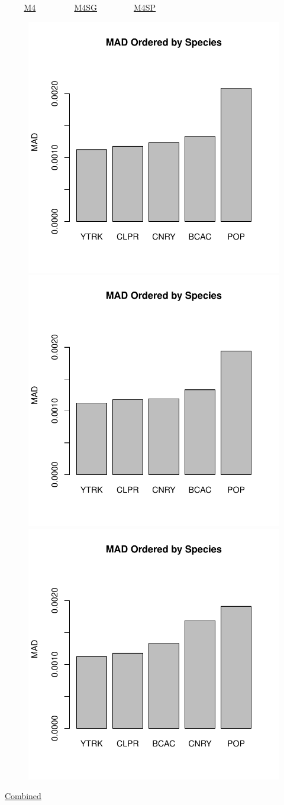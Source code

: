 \documentclass[ xcolor = pdftex, dvipsnames, table ]{beamer}
\begin{document}
\begin{frame}{$~~~~~~~~~$ \href{https://github.com/gasduster99/sppComp/tree/master/sscRuns/26919781982M4}{M4} $~~~~~~~~~~~~~~~~~~$ \href{https://github.com/gasduster99/sppComp/tree/master/sscRuns/26919781982M4IGSG}{M4SG} $~~~~~~~~~~~~~~~~~$ \href{https://github.com/gasduster99/sppComp/tree/master/sscRuns/26919781982M4IGSP}{M4SP} }
        \begin{figure}[ht!]
        \centering
        \hspace*{-1cm}
        \includegraphics[width=.4\textwidth]{../sscRuns/26919781982M4/sppHeadMad68.pdf}
        \includegraphics[width=.4\textwidth]{../sscRuns/26919781982M4IGSG/sppHeadMad68.pdf}
        \includegraphics[width=.4\textwidth]{../sscRuns/26919781982M4IGSP/sppHeadMad68.pdf}
        \end{figure}
	\vspace{-1cm}
	\begin{center}
	\Large
	\href{https://github.com/gasduster99/sppComp/tree/master/try1/postSSC/26919781982M4IGSPSG}{Combined}
	\end{center}
\end{frame}
\end{document}
